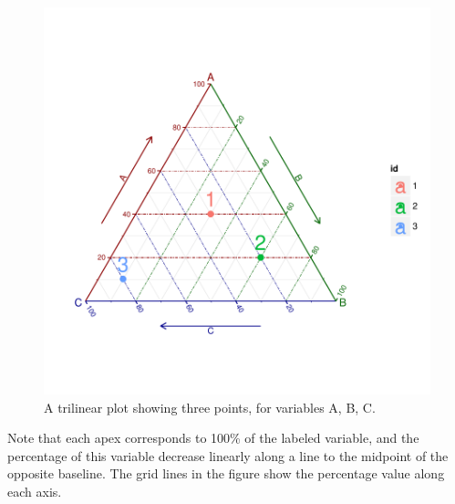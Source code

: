\documentclass[11pt]{book}
\renewenvironment{knitrout}{\small\renewcommand{\baselinestretch}{.85}}{} %
\begin{document}
\begin{knitrout}
\color{fgcolor}\begin{kframe}
\begin{alltt}
 \hlkwb{<-} \hlstd{(}
   \hlstd{=} \hlstd{(}\hlstd{,} \hlstd{,} \hlstd{),}
   \hlstd{=} \hlstd{(}\hlstd{,} \hlstd{,} \hlstd{),}
   \hlstd{=} \hlstd{(}\hlstd{,} \hlstd{,} \hlstd{),}
   \hlstd{=} \hlstd{(}\hlstd{,} \hlstd{,} \hlstd{))}
\hlstd{(} 
        \hlstd{=} \hlstd{(}  
                       \hlopt{+}
    \hlstd{(}\hlstd{(}\hlstd{=}\hlstd{))} \hlopt{+}
    \hlstd{(}\hlstd{=}\hlopt{-}\hlstd{,} \hlstd{=}\hlstd{)} \hlopt{+}
    \hlstd{()} \hlopt{+}
    \hlstd{(}\hlstd{=}\hlstd{(}\hlstd{(}\hlstd{,}\hlstd{,}\hlstd{,}\hlstd{),}\hlstd{))} \hlopt{+}
    \hlstd{(} \hlstd{=} \hlstd{)}
\end{alltt}
\end{kframe}\begin{figure}[!htbp]


\centerline{\includegraphics[width=.6\textwidth,trim=20 20 20 20,clip]{ch04/fig/tripdemo2} }

\caption[A trilinear plot showing three points, for variables A, B, C]{A trilinear plot showing three points, for variables A, B, C.\label{fig:tripdemo2}}
\end{figure}


\end{knitrout}
Note that each apex corresponds to 100\% of the labeled
variable, and the percentage of this variable decrease
linearly along a line to the midpoint of the opposite
baseline.
The grid lines in the figure show the percentage value along
each axis.
\end{document}
